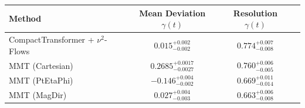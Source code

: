     \begin{tabular}{lccc}
        \toprule
        Method & Mean Deviation $\gamma(t)$ & Resolution $\gamma(t)$ \\
        \midrule
        CompactTransformer + $\nu^2$-Flows & $0.015^{+0.002}_{-0.002}$ & $0.774^{+0.007}_{-0.008}$ \\
        MMT (Cartesian) & $0.2685^{+0.0017}_{-0.0027}$ & $0.760^{+0.006}_{-0.005}$ \\
        MMT (PtEtaPhi) & $-0.146^{+0.004}_{-0.002}$ & $0.669^{+0.011}_{-0.014}$ \\
        MMT (MagDir) & $0.027^{+0.004}_{-0.003}$ & $0.663^{+0.006}_{-0.008}$ \\
        \bottomrule
    \end{tabular}